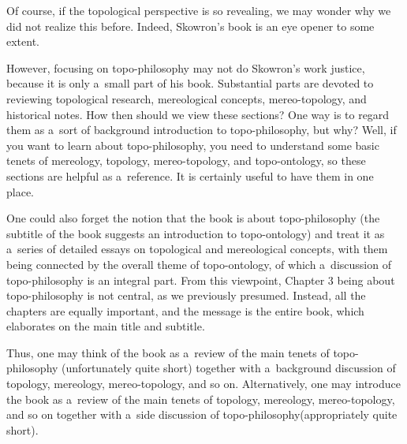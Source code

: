 Of course, if the topological perspective is so revealing, we may wonder why we did not realize this before. Indeed, Skowron's book is an eye opener to some extent.



However, focusing on topo-philosophy may not do Skowron's work justice, because it is only a~small part of his book. Substantial parts are devoted to reviewing topological research, mereological concepts, mereo-topology, and historical notes. How then should we view these sections? One way is to regard them as a~sort of background introduction to topo-philosophy, but why? Well, if you want to learn about topo-philosophy, you need to understand some basic tenets of mereology, topology, mereo-topology, and topo-ontology, so these sections are helpful as a~reference. It is certainly useful to have them in one place.



One could also forget the notion that the book is about topo-philosophy (the subtitle of the book suggests an introduction to topo-ontology) and treat it as a~series of detailed essays on topological and mereological concepts, with them being connected by the overall theme of topo-ontology, of which a~discussion of topo-philosophy is an integral part. From this viewpoint, Chapter 3 being about topo-philosophy is not central, as we previously presumed. Instead, all the chapters are equally important, and the message is the entire book, which elaborates on the main title and subtitle.



Thus, one may think of the book as a~review of the main tenets of topo-philosophy (unfortunately quite short) together with a~background discussion of topology, mereology, mereo-topology, and so on. Alternatively, one may introduce the book as a~review of the main tenets of topology, mereology, mereo-topology, and so on together with a~side discussion of topo-philosophy(appropriately quite short).




